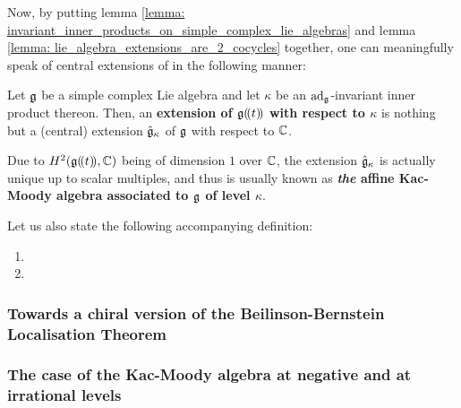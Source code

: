                 Now, by putting lemma \ref{lemma: invariant_inner_products_on_simple_complex_lie_algebras} and lemma \ref{lemma: lie_algebra_extensions_are_2_cocycles} together, one can meaningfully speak of central extensions of  in the following manner:
                \begin{definition} \label{def: central_extensions_with_respect_to_invariant_inner_products}
                    Let $\mathfrak{g}$ be a simple complex Lie algebra and let $\kappa$ be an $\mathrm{ad}_{\mathfrak{g}}$-invariant inner product thereon. Then, an \textbf{extension of $\mathfrak{g}(\!(t)\!)$ with respect to $\kappa$} is nothing but a (central) extension $\hat{\mathfrak{g}}_{\kappa}$ of $\mathfrak{g}$ with respect to $\mathbb{C}$.
                    
                    Due to $H^2(\mathfrak{g}(\!(t)\!), \mathbb{C})$ being of dimension $1$ over $\mathbb{C}$, the extension $\hat{\mathfrak{g}}_{\kappa}$ is actually unique up to scalar multiples, and thus is usually known as \textbf{\textit{the} affine Kac-Moody algebra associated to $\mathfrak{g}$ of level $\kappa$}.
                \end{definition}
                
                Let us also state the following accompanying definition:
                \begin{definition} \label{def: kac_moody_algebra_representations}
                    \noindent
                    \begin{enumerate}
                        \item 
                        \item 
                    \end{enumerate}
                \end{definition}
                
            \subsubsection{Towards a chiral version of the Beilinson-Bernstein Localisation Theorem}
            
            \subsubsection{The case of the Kac-Moody algebra at negative and at irrational levels}
            
